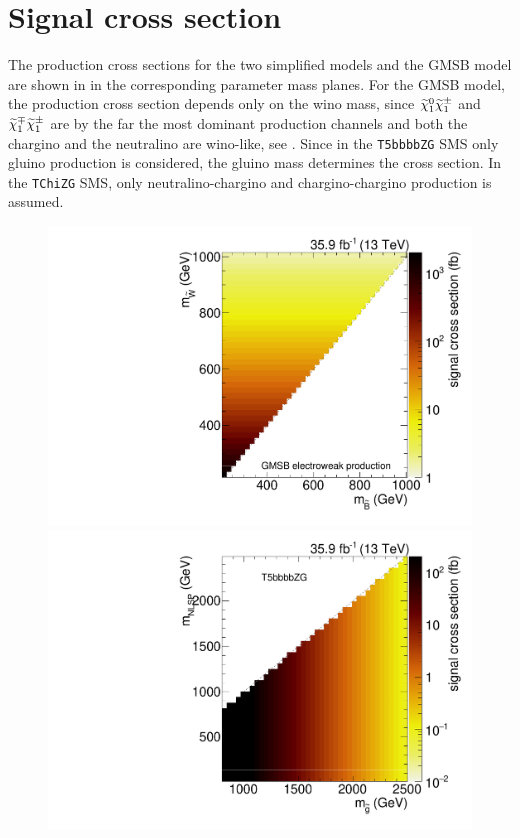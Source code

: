 \section*{Signal cross section}
The production cross sections for the two simplified models and the GMSB model are shown in  in the corresponding parameter mass planes. For the GMSB model, the production cross section depends only on the wino mass, since $\widetilde{\chi}^{0}_{1}\widetilde{\chi}^\pm_{1}$ and $\widetilde{\chi}^\mp_{1}\widetilde{\chi}^\pm_{1}$ are by the far the most dominant production channels and both the chargino and the neutralino are wino-like, see . Since in the \texttt{T5bbbbZG} SMS only gluino production is considered, the gluino mass determines the cross section. In the \texttt{TChiZG} SMS, only neutralino-chargino and chargino-chargino production is assumed.
\begin{figure}
 \includegraphics[width=\pairwidth]{figures/acceptance/GMSB_xsec_log}
 \includegraphics[width=\pairwidth]{figures/acceptance/T5bbbbZg_xsec_log}

\end{figure}
